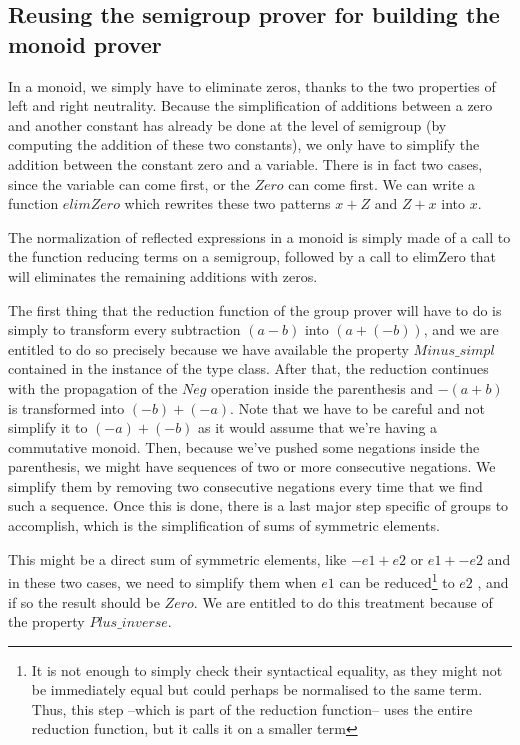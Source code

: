 \subsection {Reusing the semigroup prover for building the monoid prover}

In a monoid, we simply have to eliminate zeros, thanks to the two properties of left and right neutrality. Because the simplification of additions between a zero and another constant has already be done at the level of semigroup (by computing the addition of these two constants), we only have to simplify the addition between the constant zero and a variable. There is in fact two cases, since the variable can come first, or the $Zero$ can come first. We can write a function $elimZero$ which rewrites these two patterns $x+Z$ and $Z+x$ into $x$.


The normalization of reflected expressions in a monoid is simply made of a call to the function reducing terms on a semigroup, followed by a call to elimZero that will eliminates the remaining additions with zeros. 


The first thing that the reduction function of the group prover will have to do is simply to transform every subtraction $(a-b)$ into $(a + (-b))$, and we are entitled to do so precisely because we have available the property $Minus\_simpl$ contained in the instance of the type class.
After that, the reduction continues with the propagation of the $Neg$ operation inside the parenthesis and $-(a+b)$ is transformed into $(-b) + (-a)$. Note that we have to be careful and not simplify it to $(-a) + (-b)$ as it would assume that we're having a commutative monoid.
Then, because we've pushed some negations inside the parenthesis, we might have sequences of two or more consecutive negations. We simplify them by removing two consecutive negations every time that we find such a sequence. Once this is done, there is a last major step specific of groups to accomplish, which is the simplification of sums of symmetric elements. 

This might be a direct sum of symmetric elements, like $-e1 + e2$ or $e1 + -e2$ and in these two cases, we need to simplify them when $e1$ can be reduced\footnote{It is not enough to simply check their syntactical equality, as they might not be immediately equal but could perhaps be normalised to the same term. Thus, this step --which is part of the reduction function-- uses the entire reduction function, but it calls it on a smaller term} to $e2$ , and if so the result should be $Zero$. We are entitled to do this treatment because of the property $Plus\_inverse$.

